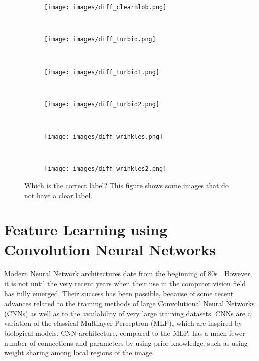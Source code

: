 \documentclass[review,12pt,3p]{elsarticle}
\begin{document}
\begin{figure}[!t]
        \centering
        \begin{subfigure}[b]{0.065\textwidth}
                \texttt{[image: images/diff\_clearBlob.png]}
                \caption{}\label{fig:example_1}
        \end{subfigure}%
        ~ %
        \begin{subfigure}[b]{0.065\textwidth}
                \texttt{[image: images/diff\_turbid.png]}
                \caption{}\label{fig:example_2}
        \end{subfigure}
        ~ %
        \begin{subfigure}[b]{0.065\textwidth}
                \texttt{[image: images/diff\_turbid1.png]}
                \caption{}\label{fig:example_3}
        \end{subfigure}
        ~
        \begin{subfigure}[b]{0.065\textwidth}
                \texttt{[image: images/diff\_turbid2.png]}
                \caption{}\label{fig:example_4}
        \end{subfigure}%
        ~
        \begin{subfigure}[b]{0.065\textwidth}
                \texttt{[image: images/diff\_wrinkles.png]}
                \caption{}\label{fig:example_5}
        \end{subfigure}
        ~
        \begin{subfigure}[b]{0.065\textwidth}
                \texttt{[image: images/diff\_wrinkles2.png]}
                \caption{}\label{fig:example_6}
        \end{subfigure}

        \caption{Which is the correct label? This figure shows some images that do not have a clear label.}
        \label{fig:difficultImages}
\end{figure}






\section{Feature Learning using Convolution Neural Networks}
\label{secMethodology}

Modern Neural Network architectures date from the beginning of 80s \cite{fukushima1980neocognitron}. However, it is not until the very recent years when their use in the computer vision field has fully emerged. Their success has been possible, because of some recent advances related to the training methods of large Convolutional Neural Networks (CNNs) \cite{krizhevsky2012imagenet} as well as to the availability of very large training datasets. CNNs are a variation of the classical Multilayer Perceptron (MLP), which are inspired by biological models. CNN architecture, compared to the MLP, has a much fewer number of connections and parameters by using prior knowledge, such as using weight sharing among local regions of the image.
\end{document}
